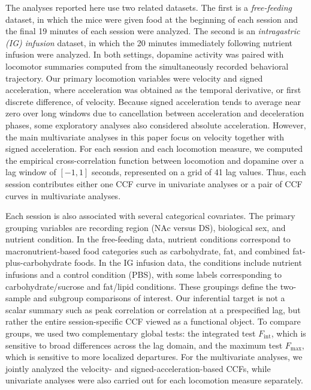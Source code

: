 \documentclass[12pt]{article}
\begin{document}
The analyses reported here use two related datasets. The first is a \emph{free-feeding} dataset, in which the mice were given food at the beginning of each session and the final 19 minutes of each session were analyzed. The second is an \emph{intragastric (IG) infusion} dataset, in which the 20 minutes immediately following nutrient infusion were analyzed. In both settings, dopamine activity was paired with locomotor summaries computed from the simultaneously recorded behavioral trajectory. Our primary locomotion variables were velocity and signed acceleration, where acceleration was obtained as the temporal derivative, or first discrete difference, of velocity. Because signed acceleration tends to average near zero over long windows due to cancellation between acceleration and deceleration phases, some exploratory analyses also considered absolute acceleration. However, the main multivariate analyses in this paper focus on velocity together with signed acceleration. For each session and each locomotion measure, we computed the empirical cross-correlation function between locomotion and dopamine over a lag window of \([-1,1]\) seconds, represented on a grid of 41 lag values. Thus, each session contributes either one CCF curve in univariate analyses or a pair of CCF curves in multivariate analyses.

Each session is also associated with several categorical covariates. The primary grouping variables are recording region (NAc versus DS), biological sex, and nutrient condition. In the free-feeding data, nutrient conditions correspond to macronutrient-based food categories such as carbohydrate, fat, and combined fat-plus-carbohydrate foods. In the IG infusion data, the conditions include nutrient infusions and a control condition (PBS), with some labels corresponding to carbohydrate/sucrose and fat/lipid conditions. These groupings define the two-sample and subgroup comparisons of interest. Our inferential target is not a scalar summary such as peak correlation or correlation at a prespecified lag, but rather the entire session-specific CCF viewed as a functional object. To compare groups, we used two complementary global tests: the integrated test \(F_{\mathrm{int}}\), which is sensitive to broad differences across the lag domain, and the maximum test \(F_{\max}\), which is sensitive to more localized departures. 
For the multivariate analyses, we jointly analyzed the velocity- and signed-acceleration-based CCFs, while univariate analyses were also carried out for each locomotion measure separately.
\end{document}
